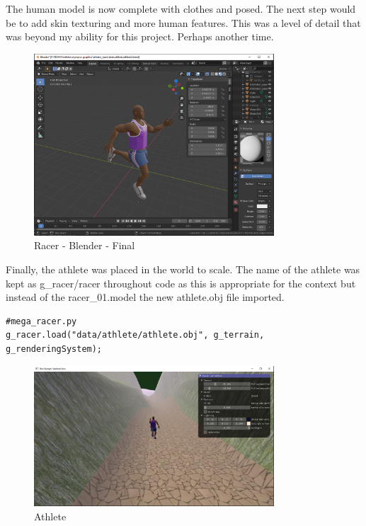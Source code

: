 \documentclass[a4 paper, 12pt]{article}
\begin{document}
The human model is now complete with clothes and posed. The next step would be to add skin texturing and more human features. This was a level of detail that was beyond my ability for this project. Perhaps another time.
\begin{figure} [H]
    \centering
    \includegraphics[width=0.8\textwidth, frame]
        {./images/olympics/athlete_blend_clothes.PNG}  
    \caption{Racer - Blender - Final}   
\end{figure}

Finally, the athlete was placed in the world to scale. The name of the athlete was kept as g\_racer/racer throughout code as this is appropriate for the context but instead of the racer\_01.model the new athlete.obj file imported.
\begin{lstlisting}
#mega_racer.py    
g_racer.load("data/athlete/athlete.obj", g_terrain, g_renderingSystem);
\end{lstlisting}

\begin{figure} [H]
    \centering
    \includegraphics[width=0.8\textwidth, frame]
        {./images/olympics/athlete_world.PNG}  
    \caption{Athlete}   
\end{figure}
\end{document}
